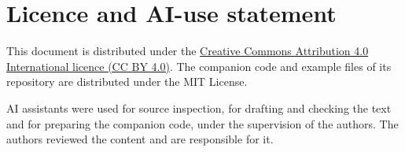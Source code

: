 \documentclass[12pt]{article}
\begin{document}
\section*{Licence and AI-use statement}
This document is distributed under the \href{https://creativecommons.org/licenses/by/4.0/}{Creative Commons Attribution 4.0 International licence (CC BY 4.0)}. The companion code and example files of its repository are distributed under the MIT License.

AI assistants were used for source inspection, for drafting and checking the text and for preparing the companion code, under the supervision of the authors. The authors reviewed the content and are responsible for it.
\end{document}
